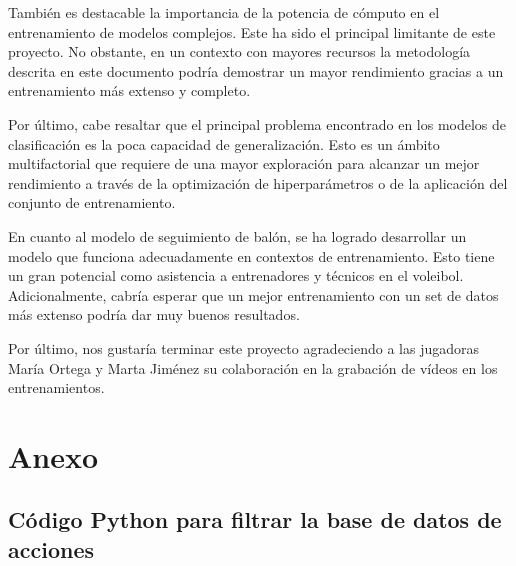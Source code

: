 \documentclass[12pt]{report} %
\begin{document}
    También es destacable la importancia de la potencia de cómputo en el
    entrenamiento de modelos complejos. Este ha sido el principal limitante de
    este proyecto. No obstante, en un contexto con mayores recursos la
    metodología descrita en este documento podría demostrar un mayor
    rendimiento gracias a un entrenamiento más extenso y completo.

    Por último, cabe resaltar que el principal problema encontrado en los
    modelos de clasificación es la poca capacidad de generalización. Esto es un
    ámbito multifactorial que requiere de una mayor exploración para alcanzar
    un mejor rendimiento a través de la optimización de hiperparámetros o de la
    aplicación del conjunto de entrenamiento.

    En cuanto al modelo de seguimiento de balón, se ha logrado desarrollar un
    modelo que funciona adecuadamente en contextos de entrenamiento. Esto tiene
    un gran potencial como asistencia a entrenadores y técnicos en el voleibol.
    Adicionalmente, cabría esperar que un mejor entrenamiento con un set de
    datos más extenso podría dar muy buenos resultados.

    Por último, nos gustaría terminar este proyecto agradeciendo a las
    jugadoras María Ortega y Marta Jiménez su colaboración en la grabación de
    vídeos en los entrenamientos.



    \clearpage

    \label{chap:bibliography}
    \printbibliography


    \chapter*{Anexo}
    \label{anexo}

    \section*{Código Python para filtrar la base de datos de acciones}
    \label{filtrado_script}
    
\end{document}
